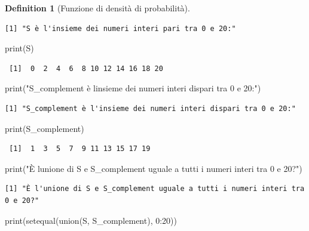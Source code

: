 \documentclass[
  letterpaper,
  DIV=11,
  numbers=noendperiod,
  oneside]{scrreprt}
\newenvironment{Shaded}{\begin{snugshade}}{\end{snugshade}}
\newcommand{\DecValTok}[1]{\textcolor[rgb]{0.68,0.00,0.00}{#1}}
\newcommand{\FunctionTok}[1]{\textcolor[rgb]{0.28,0.35,0.67}{#1}}
\newcommand{\NormalTok}[1]{\textcolor[rgb]{0.00,0.23,0.31}{#1}}
\newcommand{\SpecialCharTok}[1]{\textcolor[rgb]{0.37,0.37,0.37}{#1}}
\newcommand{\StringTok}[1]{\textcolor[rgb]{0.13,0.47,0.30}{#1}}
\theoremstyle{definition}
\theoremstyle{plain}
\theoremstyle{definition}
\newtheorem{definition}{Definition}[chapter]
\theoremstyle{remark}
\begin{document}
\begin{definition}[Funzione di densità di
probabilità]
\begin{verbatim}
[1] "S è l'insieme dei numeri interi pari tra 0 e 20:"
\end{verbatim}

\begin{Shaded}
\begin{Highlighting}[]
\FunctionTok{print}\NormalTok{(S)}
\end{Highlighting}
\end{Shaded}

\begin{verbatim}
 [1]  0  2  4  6  8 10 12 14 16 18 20
\end{verbatim}

\begin{Shaded}
\begin{Highlighting}[]
\FunctionTok{print}\NormalTok{(}\StringTok{"S\_complement è l\textquotesingle{}insieme dei numeri interi dispari tra 0 e 20:"}\NormalTok{)}
\end{Highlighting}
\end{Shaded}

\begin{verbatim}
[1] "S_complement è l'insieme dei numeri interi dispari tra 0 e 20:"
\end{verbatim}

\begin{Shaded}
\begin{Highlighting}[]
\FunctionTok{print}\NormalTok{(S\_complement)}
\end{Highlighting}
\end{Shaded}

\begin{verbatim}
 [1]  1  3  5  7  9 11 13 15 17 19
\end{verbatim}

\begin{Shaded}
\begin{Highlighting}[]
\FunctionTok{print}\NormalTok{(}\StringTok{"È l\textquotesingle{}unione di S e S\_complement uguale a tutti i numeri interi tra 0 e 20?"}\NormalTok{)}
\end{Highlighting}
\end{Shaded}

\begin{verbatim}
[1] "È l'unione di S e S_complement uguale a tutti i numeri interi tra 0 e 20?"
\end{verbatim}

\begin{Shaded}
\begin{Highlighting}[]
\FunctionTok{print}\NormalTok{(}\FunctionTok{setequal}\NormalTok{(}\FunctionTok{union}\NormalTok{(S, S\_complement), }\DecValTok{0}\SpecialCharTok{:}\DecValTok{20}\NormalTok{))}
\end{Highlighting}
\end{Shaded}


\end{definition}
\end{document}
